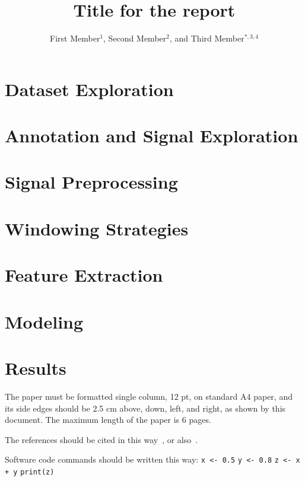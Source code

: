 \documentclass[12pt,a4paper]{cibb}
\title{\Large $\ $\\ \bf Title for the report}
\author{\large First Member$^1$, Second Member$^{2}$, and Third Member$^{*,3,4}$}
\begin{document}
\renewcommand{\thefootnote}{}


\thispagestyle{myheadings}
\pagestyle{myheadings}


\section{Dataset Exploration}
\label{sec:Dataset Exploration }


\section{Annotation and Signal Exploration}
\label{sec:Annotation}

 \section{Signal Preprocessing}
\label{sec:Signal}

\section{Windowing Strategies}
\label{sec:Windowing}

\section{Feature Extraction}
\label{sec:Feature}

\section{Modeling}
\label{sec:Modeling}

\section{Results}
\label{sec:RESULTS}

The paper  must be formatted  single column, 12 pt,  on standard A4 paper, and its side edges should be 2.5 cm above, down, left, and right, as shown by this document. The maximum length of  the paper is 6 pages.

The references   should   be   cited   in   this   way~\cite{domingos2012few,powell2020tried},   or also~\cite{vcuklina2020review,hansen2014scientific,WWW-GO}.

Software code commands should be written this way: 
\newline
\texttt{x <- 0.5} \newline
\texttt{y <- 0.8} \newline
\texttt{z <- x + y} \newline
\texttt{print(z)} \newline
\end{document}
